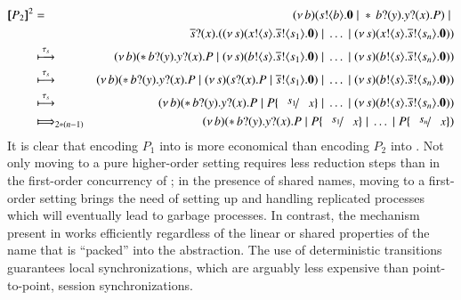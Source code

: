 \begin{eqnarray*}
\pmap{P_2}{2} & = & 	\newsp{b}{\bout{s}{b} \inact \Par \repl \binp{b}{y} \binp{y}{x} P} \Par \\
& & \qquad \qquad \binp{\dual{s}}{x} (\newsp{s}{\bout{x}{s} \bout{\dual{s}}{s_1} \inact} \Par \dots \Par \newsp{s}{\bout{x}{s} \bout{\dual{s}}{s_n}\inact})
	\\
	& \hby{\stau} & 
	\newsp{b}{\repl \binp{b}{y} \binp{y}{x} P \Par \newsp{s}{\bout{b}{s} \bout{\dual{s}}{s_1} \inact} \Par \dots \Par \newsp{s}{\bout{b}{s} \bout{\dual{s}}{s_n} \inact}}
	\\
	& \hby{\stau} & 
	\newsp{b}{\repl \binp{b}{y} \binp{y}{x} P \Par \newsp{s}{\binp{s}{x} P \Par \bout{\dual{s}}{s_1} \inact} \Par \dots \Par \newsp{s}{\bout{b}{s} \bout{\dual{s}}{s_n} \inact}}
	\\
	& \hby{\stau} & 
	\newsp{b}{\repl \binp{b}{y} \binp{y}{x} P \Par P\subst{s_1}{x} \Par \dots \Par \newsp{s}{\bout{b}{s} \bout{\dual{s}}{s_n} \inact}}
	\\
	& \Hby{}_{2*(n - 1)} & 
	\newsp{b}{\repl \binp{b}{y} \binp{y}{x} P \Par P\subst{s_1}{x} \Par \dots \Par P\subst{s_n}{x}}
\end{eqnarray*}
\noi 
It is clear that encoding $P_1$ into \HO is more economical than 
encoding $P_2$ into \sessp. Not only moving to a pure higher-order setting requires less reduction steps than in the first-order concurrency of \sessp; in the presence of shared names, moving to a first-order setting brings the need of setting up and handling replicated processes which will eventually lead to garbage processes. In contrast, the mechanism present in \HO works efficiently regardless of the linear or shared properties of the name that is ``packed'' into the abstraction. 
The use of deterministic transitions guarantees local synchronizations, which are arguably less expensive than point-to-point, session synchronizations.

